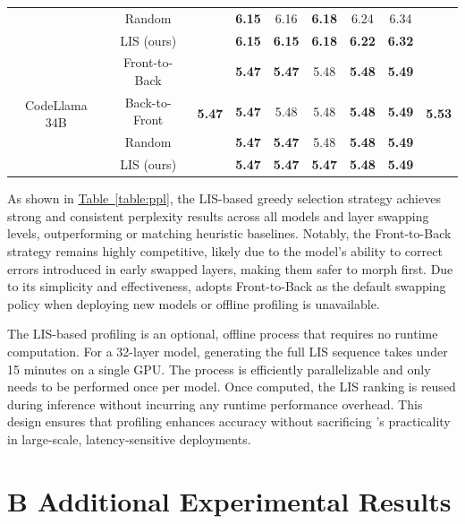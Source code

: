 \begin{table}[ht]
\begin{tabular}{cc|ccccccc}
& Random        &                       & \textbf{6.15} & 6.16 & \textbf{6.18} & 6.24 & 6.34 &            \\
& LIS (ours)          &                       & \textbf{6.15} & \textbf{6.15} & \textbf{6.18} & \textbf{6.22} & \textbf{6.32} &            \\
\midrule
\multirow{4}{*}{CodeLlama 34B}
& Front-to-Back & \multirow{4}{*}{\textbf{5.47}} & \textbf{5.47} & \textbf{5.47} & 5.48 & \textbf{5.48} & \textbf{5.49} & \multirow{4}{*}{\textbf{5.53}} \\
& Back-to-Front &                       & \textbf{5.47} & 5.48 & 5.48 & \textbf{5.48} & \textbf{5.49} &            \\
& Random        &                       & \textbf{5.47} & \textbf{5.47} & 5.48 & \textbf{5.48} & \textbf{5.49} &       \multirow{2}{*}{\textbf{(48 INT4)}}     \\
& LIS (ours)          &                       & \textbf{5.47} & \textbf{5.47} & \textbf{5.47} & \textbf{5.48} & \textbf{5.49} &            \\
\bottomrule
\end{tabular}
\end{table}

As shown in \hyperref[table:ppl]{Table~\ref{table:ppl}}, the LIS-based greedy selection strategy achieves strong and consistent perplexity results across all models and layer swapping levels, outperforming or matching heuristic baselines. Notably, the Front-to-Back strategy remains highly competitive, likely due to the model's ability to correct errors introduced in early swapped layers, making them safer to morph first. Due to its simplicity and effectiveness, {\system} adopts Front-to-Back as the default swapping policy when deploying new models or offline profiling is unavailable.

The LIS-based profiling is an optional, offline process that requires no runtime computation. For a 32-layer model, generating the full LIS sequence takes under 15 minutes on a single GPU. The process is efficiently parallelizable and only needs to be performed once per model. Once computed, the LIS ranking is reused during inference without incurring any runtime performance overhead. This design ensures that profiling enhances accuracy without sacrificing {\system}’s practicality in large-scale, latency-sensitive deployments.


\section*{B \quad Additional Experimental Results}

